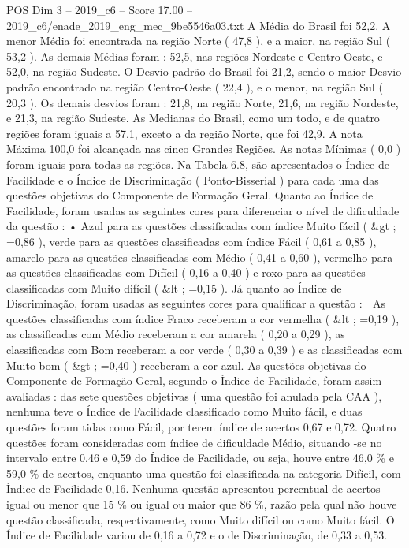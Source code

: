 \begin{textsample}{POS Dim 3 – 2019\_c6 – Score 17.00 – 2019\_c6/enade\_2019\_eng\_mec\_9be5546a03.txt}
A Média do Brasil foi 52,2.
A menor Média foi encontrada na região Norte ( 47,8 ), e a maior, na região Sul ( 53,2 ).
As demais Médias foram : 52,5, nas regiões Nordeste e Centro-Oeste, e 52,0, na região Sudeste.
O Desvio padrão do Brasil foi 21,2, sendo o maior Desvio padrão encontrado na região Centro-Oeste ( 22,4 ), e o menor, na região Sul ( 20,3 ).
Os demais desvios foram : 21,8, na região Norte, 21,6, na região Nordeste, e 21,3, na região Sudeste.
As Medianas do Brasil, como um todo, e de quatro regiões foram iguais a 57,1, exceto a da região Norte, que foi 42,9.
A nota Máxima 100,0 foi alcançada nas cinco Grandes Regiões.
As notas Mínimas ( 0,0 ) foram iguais para todas as regiões.
Na Tabela 6.8, são apresentados o Índice de Facilidade e o Índice de Discriminação ( Ponto-Bisserial ) para cada uma das questões objetivas do Componente de Formação Geral.
Quanto ao Índice de Facilidade, foram usadas as seguintes cores para diferenciar o nível de dificuldade da questão : • Azul para as questões classificadas com índice Muito fácil ( \&gt ; =0,86 ), verde para as questões classificadas com índice Fácil ( 0,61 a 0,85 ), amarelo para as questões classificadas com Médio ( 0,41 a 0,60 ), vermelho para as questões classificadas com Difícil ( 0,16 a 0,40 ) e roxo para as questões classificadas com Muito difícil ( \&lt ; =0,15 ).
Já quanto ao Índice de Discriminação, foram usadas as seguintes cores para qualificar a questão :  As questões classificadas com índice Fraco receberam a cor vermelha ( \&lt ; =0,19 ), as classificadas com Médio receberam a cor amarela ( 0,20 a 0,29 ), as classificadas com Bom receberam a cor verde ( 0,30 a 0,39 ) e as classificadas com Muito bom ( \&gt ; =0,40 ) receberam a cor azul.
As questões objetivas do Componente de Formação Geral, segundo o Índice de Facilidade, foram assim avaliadas : das sete questões objetivas ( uma questão foi anulada pela CAA ), nenhuma teve o Índice de Facilidade classificado como Muito fácil, e duas questões foram tidas como Fácil, por terem índice de acertos 0,67 e 0,72.
Quatro questões foram consideradas com índice de dificuldade Médio, situando -se no intervalo entre 0,46 e 0,59 do Índice de Facilidade, ou seja, houve entre 46,0 \% e 59,0 \% de acertos, enquanto uma questão foi classificada na categoria Difícil, com Índice de Facilidade 0,16.
Nenhuma questão apresentou percentual de acertos igual ou menor que 15 \% ou igual ou maior que 86 \%, razão pela qual não houve questão classificada, respectivamente, como Muito difícil ou como Muito fácil.
O Índice de Facilidade variou de 0,16 a 0,72 e o de Discriminação, de 0,33 a 0,53.

\end{textsample}
